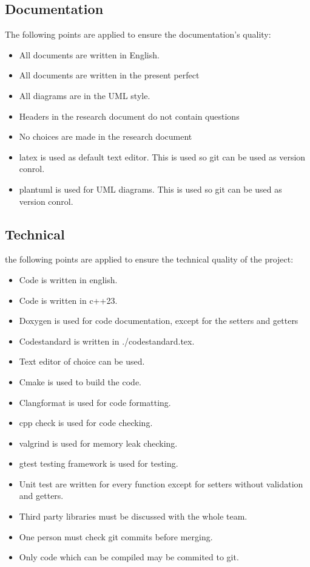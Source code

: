 \documentclass{article} %
\begin{document}
\subsection{Documentation}
The following points are applied to ensure the documentation’s quality:
\begin{itemize}
    \item All documents are written in English.
    \item All documents are written in the present perfect
    \item All diagrams are in the UML style.
    \item Headers in the research document do not contain questions
    \item No choices are made in the research document
    \item latex is used as default text editor. This is used so git can be used as version conrol.
    \item plantuml is used for UML diagrams. This is used so git can be used as version conrol.
\end{itemize}
\subsection{Technical}
the following points are applied to ensure the technical quality of the project:
\begin{itemize}
    \item Code is written in english.
    \item Code is written in c++23.
    \item Doxygen is used for code documentation, except for the setters and getters
    \item Codestandard is written in ./codestandard.tex.
    \item Text editor of choice can be used.
    \item Cmake is used to build the code.
    \item Clangformat is used for code formatting.
    \item cpp check is used for code checking.
    \item valgrind is used for memory leak checking.
    \item gtest testing framework is used for testing.
    \item Unit test are written for every function except for setters without validation and getters.
    \item Third party libraries must be discussed with the whole team.
    \item One person must check git commits before merging.
    \item Only code which can be compiled may be commited to git.
\end{itemize}
\end{document}
